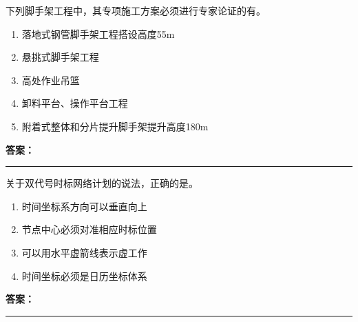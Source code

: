 \documentclass[UTF8,fontset=fandol,11pt]{ctexart}
\newcommand{\answerline}{\textcolor{answerred}{\rule{2.4cm}{0.7pt}}}
\begin{document}
\begin{quizbox}[title={乱序第 187 题｜第七章脚手架工程}]

下列脚手架工程中，其专项施工方案必须进行专家论证的有。\\

\begin{enumerate}[label=\Alph*.]

\item 落地式钢管脚手架工程搭设高度55m

\item 悬挑式脚手架工程

\item 高处作业吊篮

\item 卸料平台、操作平台工程

\item 附着式整体和分片提升脚手架提升高度180m

\end{enumerate}

\textbf{\textcolor{answerred}{答案：}} \answerline

\end{quizbox}

\vspace{0.2em}

\begin{quizbox}[title={乱序第 188 题｜第十一章网络计划技术}]

关于双代号时标网络计划的说法，正确的是。\\

\begin{enumerate}[label=\Alph*.]

\item 时间坐标系方向可以垂直向上

\item 节点中心必须对准相应时标位置

\item 可以用水平虚箭线表示虚工作

\item 时间坐标必须是日历坐标体系

\end{enumerate}

\textbf{\textcolor{answerred}{答案：}} \answerline

\end{quizbox}

\vspace{0.2em}
\end{document}
